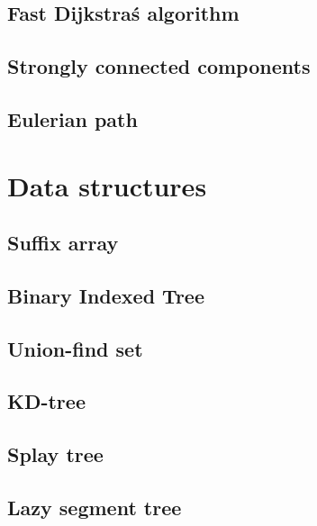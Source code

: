 \subsection{Fast Dijkstra\'s algorithm}
\raggedbottom
\hrulefill
\subsection{Strongly connected components}
\raggedbottom
\hrulefill
\subsection{Eulerian path}
\raggedbottom

\section{Data structures}
\subsection{Suffix array}
\raggedbottom
\hrulefill
\subsection{Binary Indexed Tree}
\raggedbottom
\hrulefill
\subsection{Union-find set}
\raggedbottom
\hrulefill
\subsection{KD-tree}
\raggedbottom
\hrulefill
\subsection{Splay tree}
\raggedbottom
\hrulefill
\subsection{Lazy segment tree}
\raggedbottom
\hrulefill
